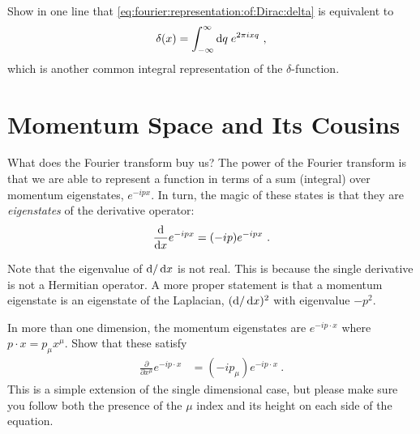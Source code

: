 \documentclass[12pt, oneside]{report}    %
\let\oldsection\section
\def\section{%
  \setcounter{sidenote}{1}%
  \oldsection
}
\begin{document}
\begin{exercise}
Show in one line that \eqref{eq:fourier:representation:of:Dirac:delta} is equivalent to
\begin{align}
    \delta(x) = \int_{-\infty}^\infty \operatorname{d}\!{q}\; e^{2\pi i xq} \ ,
\end{align}
which is another common integral representation of the $\delta$-function.
\end{exercise}

\section{Momentum Space and Its Cousins}

What does the Fourier transform buy us? The power of the Fourier transform is that we are able to represent a function in terms of a sum (integral) over momentum eigenstates, $e^{-ipx}$. In turn, the magic of these states is that they are \emph{eigenstates} of the derivative operator:
\begin{align}
    \frac{\operatorname{d}\!{}}{\operatorname{d}\!{x}} e^{-ipx} = (-ip) e^{-ipx} \ .
\end{align}
\begin{example}
Note that the eigenvalue of $\operatorname{d}\!{}/\operatorname{d}\!{x}$ is not real. This is because the single derivative is not a Hermitian operator. A more proper statement is that a momentum eigenstate is an eigenstate of the Laplacian, $(\operatorname{d}\!{}/\operatorname{d}\!{x})^2$ with eigenvalue $-p^2$.
\end{example}
\begin{exercise}
In more than one dimension, the momentum eigenstates are $e^{-i p\cdot x}$ where $p\cdot x = p_\mu x^\mu$. Show that these satisfy
\begin{align}
    \frac{\partial}{\partial x^\mu} e^{-ip\cdot x}
    &= (-ip_\mu) e^{-ip\cdot x} \ .
\end{align}
This is a simple extension of the single dimensional case, but please make sure you follow both the presence of the $\mu$ index and its height on each side of the equation.
\end{exercise}
\end{document}
